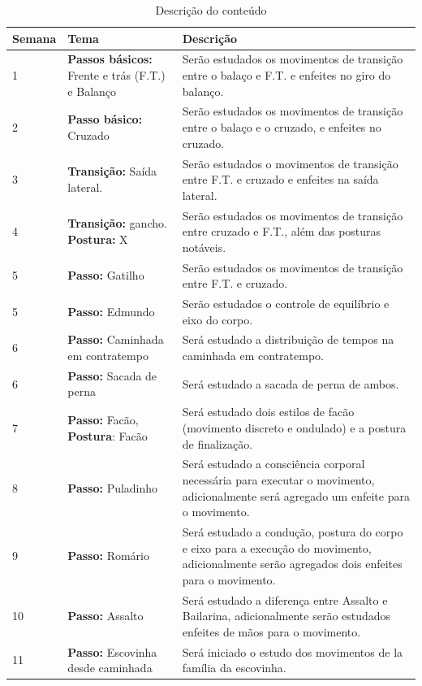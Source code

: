 \documentclass{article}
\begin{document}
\begin{table}[h]
\centering
\begin{tabular}{|p{1.5cm}|p{5cm}|p{9cm}|}
\hline
Semana & Tema & Descrição \\  \hline
1 &  \textbf{Passos básicos:} Frente e trás (F.T.) e Balanço & Serão estudados os movimentos de transição entre o balaço e F.T. e enfeites no giro do balanço.\\ \hline
2 &  \textbf{Passo básico:} Cruzado &  Serão estudados os movimentos de transição entre o balaço e o cruzado, e enfeites no cruzado. \\ \hline
3 &  \textbf{Transição:} Saída lateral. &  Serão estudados o movimentos de transição entre F.T. e cruzado e enfeites na saída lateral.\\ \hline
4 &  \textbf{Transição:} gancho. \textbf{Postura:} X &  Serão estudados os movimentos de transição entre cruzado e F.T., além das posturas notáveis.\\ \hline                     
5 &  \textbf{Passo:} Gatilho &  Serão estudados os movimentos de transição entre F.T. e cruzado. \\ \hline
5 &  \textbf{Passo:} Edmundo &  Serão estudados o controle de equilíbrio e eixo do corpo. \\ \hline
6 &  \textbf{Passo:} Caminhada em contratempo & Será estudado a distribuição de tempos na caminhada em contratempo. \\ \hline
6 &  \textbf{Passo:} Sacada de perna & Será estudado a sacada de perna de ambos. \\ \hline
7 &  \textbf{Passo:} Facão, \textbf{Postura}: Facão & Será estudado dois estilos de facão (movimento discreto e ondulado) e a postura de finalização. \\ \hline
8 &  \textbf{Passo:} Puladinho & Será estudado a consciência corporal necessária para executar o movimento, adicionalmente será agregado um enfeite para o movimento. \\ \hline
9 &  \textbf{Passo:} Romário & Será estudado a condução, postura do corpo e eixo para a execução do movimento, adicionalmente serão agregados dois enfeites para o movimento. \\ \hline
10&  \textbf{Passo:} Assalto & Será estudado a diferença entre Assalto e Bailarina, adicionalmente serão estudados enfeites de mãos para o movimento. \\ \hline
11&  \textbf{Passo:} Escovinha desde caminhada & Será iniciado o estudo dos movimentos de la família da escovinha. \\ \hline

\end{tabular}
\caption{Descrição do conteúdo}
\label{tab:myfirsttable}
\end{table}
\end{document}
